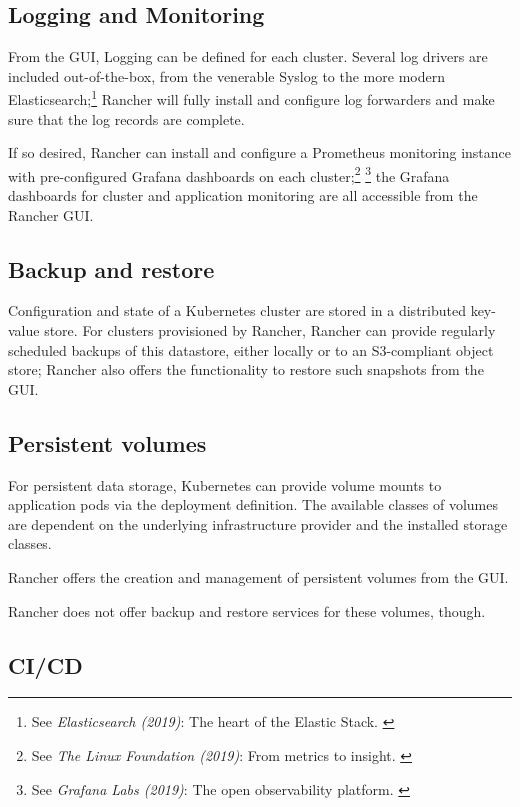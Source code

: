 \subsection{Logging and Monitoring}

From the GUI, Logging can be defined for each cluster. Several log drivers are included out-of-the-box, from the venerable Syslog to the more modern Elasticsearch;\footnote{See \textit{Elasticsearch (2019)}: The heart of the Elastic Stack. \cite{elastic}} Rancher will fully install and configure log forwarders and make sure that the log records are complete.

If so desired, Rancher can install and configure a Prometheus monitoring instance with pre-configured Grafana dashboards on each cluster;\footnote{See \textit{The Linux Foundation (2019)}: From metrics to insight. \cite{prometheus}} \footnote{See \textit{Grafana Labs (2019)}: The open observability platform. \cite{grafana}} the Grafana dashboards for cluster and application monitoring are all accessible from the Rancher GUI.

\subsection{Backup and restore}

Configuration and state of a Kubernetes cluster are stored in a distributed key-value store. For clusters provisioned by Rancher, Rancher can provide regularly scheduled backups of this datastore, either locally or to an S3-compliant object store; Rancher also offers the functionality to restore such snapshots from the GUI.

\subsection{Persistent volumes}

For persistent data storage, Kubernetes can provide volume mounts to application pods via the deployment definition. The available classes of volumes are dependent on the underlying infrastructure provider and the installed storage classes.

Rancher offers the creation and management of persistent volumes from the GUI.

Rancher does not offer backup and restore services for these volumes, though.

\subsection{CI/CD}

